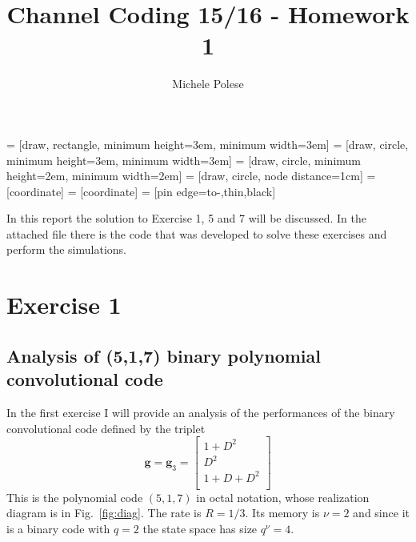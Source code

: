 \documentclass[10pt]{article}
\begin{document}
\title{Channel Coding 15/16 - Homework 1}
\author{Michele Polese}

\maketitle

 = [draw, rectangle, 
    minimum height=3em, minimum width=3em]
 = [draw, circle, minimum height=3em, minimum width=3em]
 = [draw, circle, minimum height=2em, minimum width=2em]
 = [draw, circle, node distance=1cm]
 = [coordinate]
 = [coordinate]
 = [pin edge={to-,thin,black}]

In this report the solution to Exercise 1, 5 and 7 will be discussed. In the attached file there is the code that was developed to solve these exercises and perform the simulations.


\section{Exercise 1}

\subsection{Analysis of (5,1,7) binary polynomial convolutional code}

In the first exercise I will provide an analysis of the performances of the binary convolutional code defined by the triplet 
\begin{equation}
	\mathbf{g} = \mathbf{g}_3 = \begin{bmatrix}
			1 + D^2 \\
			D^2	\\
			1 + D + D^2 \\
			\end{bmatrix}
\end{equation}
This is the polynomial code $(5,1,7)$ in octal notation, whose realization diagram is in Fig.~\ref{fig:diag}. The rate is $R = 1/3$. Its memory is $\nu = 2$ and since it is a binary code with $q = 2$ the state space has size $q^\nu = 4$. %
\end{document}
